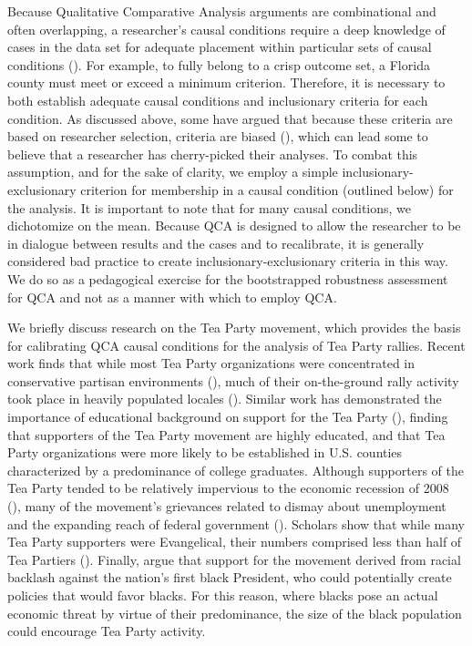 \documentclass[12pt]{article}
\begin{document}
{Because Qualitative Comparative Analysis arguments are combinational and often overlapping, a researcher's causal conditions require a deep knowledge of cases in the data set for adequate placement within particular sets of causal conditions (\citealt{ragin_2008}). For example, to fully belong to a crisp outcome set, a Florida county must meet or exceed a minimum criterion. Therefore, it is necessary to both establish adequate causal conditions and inclusionary criteria for each condition. As discussed above, some have argued that because these criteria are based on researcher selection, criteria are biased (\citealt{lieberson_2004}), which can lead some to believe that a researcher has cherry-picked their analyses. To combat this assumption, and for the sake of clarity, we employ a simple inclusionary-exclusionary criterion for membership in a causal condition (outlined below) for the analysis. It is important to note that for many causal conditions, we dichotomize on the mean. Because QCA is designed to allow the researcher to be in dialogue between results and the cases and to recalibrate, it is generally considered bad practice to create inclusionary-exclusionary criteria in this way. We do so as a pedagogical exercise for the bootstrapped robustness assessment for QCA and not as a manner with which to employ QCA.

We briefly discuss research on the Tea Party movement, which provides the basis for calibrating QCA causal conditions for the analysis of Tea Party rallies. Recent work finds that while most Tea Party organizations were concentrated in conservative partisan environments (\citealt{mcveigh_et_al_2014a,skocpol_and_williamson_2012}), much of their on-the-ground rally activity took place in heavily populated locales (\citealt{skocpol_and_williamson_2012,zernike_2010}). Similar work has demonstrated the importance of educational background on support for the Tea Party (\citealt{mcveigh_et_al_2014a,skocpol_and_williamson_2012}), finding that supporters of the Tea Party movement are highly educated, and that Tea Party organizations were more likely to be established in U.S. counties characterized by a predominance of college graduates. Although supporters of the Tea Party tended to be relatively impervious to the economic recession of 2008 (\citealt{skocpol_and_williamson_2012,parker_and_barreto_2013}), many of the movement's grievances related to dismay about unemployment and the expanding reach of federal government (\citealt{skocpol_and_williamson_2012,mcveigh_et_al_2014a,parker_and_barreto_2013}). Scholars show that while many Tea Party supporters were Evangelical, their numbers comprised less than half of Tea Partiers (\citealt{zernike_2010,skocpol_and_williamson_2012,mcveigh_et_al_2014a}). Finally, \citet{parker_and_barreto_2013} argue that support for the movement derived from racial backlash against the nation's first black President, who could potentially create policies that would favor blacks. For this reason, where blacks pose an actual economic threat by virtue of their predominance, the size of the black population could encourage Tea Party activity. 

}
\end{document}
